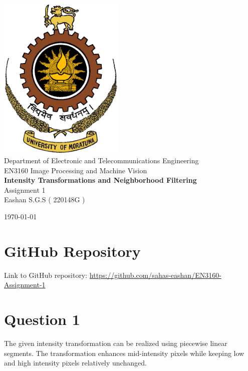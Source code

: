 \documentclass[10pt,a4paper]{article}
\begin{document}
\begin{titlepage}
    \centering
    \vspace*{2cm}

    \includegraphics[width=6cm]{image.png}\\[1cm]
    {\LARGE Department of Electronic and Telecommunications Engineering}\\[0.5cm]
    
    {\Large EN3160 Image Processing and Machine Vision}\\[1cm]
    
    {\huge \textbf{Intensity Transformations and Neighborhood Filtering}}\\[0.5cm]
    {\Large Assignment 1}\\[2cm]
    
    {\Large Eashan S.G.S ( 220148G )}\\[1cm]
    
    \vfill
    
    {\large \today}
\end{titlepage}

\section*{GitHub Repository}
Link to GitHub repository: \url{https://github.com/sahas-eashan/EN3160-Assignment-1}

\section{Question 1}
The given intensity transformation can be realized using piecewise linear segments. The transformation enhances mid-intensity pixels while keeping low and high intensity pixels relatively unchanged.
\end{document}
